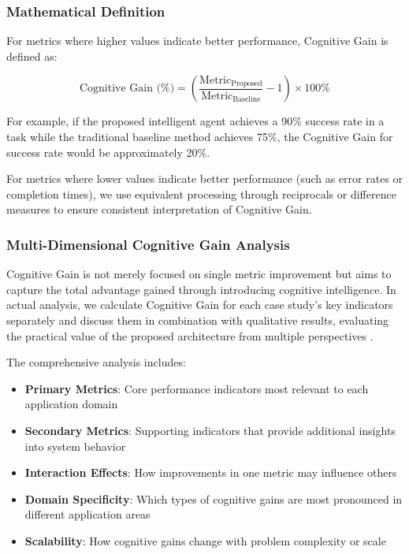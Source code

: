 \subsubsection{Mathematical Definition}

For metrics where higher values indicate better performance, Cognitive Gain is defined as:

\begin{equation}
\text{Cognitive Gain (\%)} = \left(\frac{\text{Metric}_{\text{Proposed}}}{\text{Metric}_{\text{Baseline}}} - 1\right) \times 100\%
\end{equation}

For example, if the proposed intelligent agent achieves a 90\% success rate in a task while the traditional baseline method achieves 75\%, the Cognitive Gain for success rate would be approximately 20\%.

For metrics where lower values indicate better performance (such as error rates or completion times), we use equivalent processing through reciprocals or difference measures to ensure consistent interpretation of Cognitive Gain.

\subsubsection{Multi-Dimensional Cognitive Gain Analysis}

Cognitive Gain is not merely focused on single metric improvement but aims to capture the total advantage gained through introducing cognitive intelligence. In actual analysis, we calculate Cognitive Gain for each case study's key indicators separately and discuss them in combination with qualitative results, evaluating the practical value of the proposed architecture from multiple perspectives \cite{hernandez2022measuring}.

The comprehensive analysis includes:

\begin{itemize}
\item \textbf{Primary Metrics}: Core performance indicators most relevant to each application domain
\item \textbf{Secondary Metrics}: Supporting indicators that provide additional insights into system behavior
\item \textbf{Interaction Effects}: How improvements in one metric may influence others
\item \textbf{Domain Specificity}: Which types of cognitive gains are most pronounced in different application areas
\item \textbf{Scalability}: How cognitive gains change with problem complexity or scale
\end{itemize}

